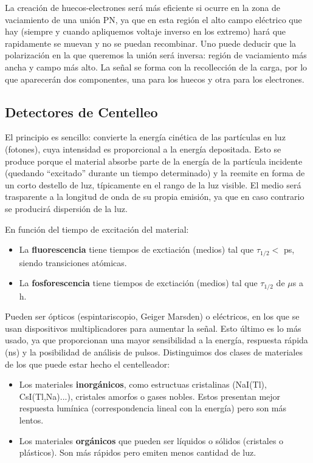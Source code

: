 La creación de huecos-electrones será más eficiente si ocurre en la zona de vaciamiento de una unión PN, ya que en esta región el alto campo eléctrico que hay (siempre y cuando apliquemos voltaje inverso en los extremo) hará que rapidamente se muevan y no se puedan recombinar. Uno puede deducir que la polarización en la que queremos la unión será inversa: región de vaciamiento más ancha y campo más alto. La señal se forma con la recollección de la carga, por lo que aparecerán dos componentes, una para los huecos y otra para los electrones. 


\subsection{Detectores de Centelleo}

El principio es sencillo: convierte la energía cinética de las partículas en luz (fotones), cuya intensidad es proporcional a la energía depositada.  Esto se produce porque el material absorbe parte de la energía de la partícula incidente (quedando ``excitado'' durante un tiempo determinado) y la reemite en forma de un corto destello de luz, típicamente en el rango de la luz visible. El medio será trasparente a la longitud de onda de su propia emisión, ya que en caso contrario se producirá dispersión de la luz. 


En función del tiempo de excitación del material:

\begin{itemize}
    \item La \textbf{fluorescencia} tiene tiempos de exctiación (medios) tal que $\tau_{1/2} <$ ps, siendo transiciones atómicas.
    \item La \textbf{fosforescencia} tiene tiempos de exctiación (medios) tal que $\tau_{1/2}$ de $\mu$s a h.
\end{itemize}
Pueden ser ópticos (espintariscopio, Geiger Marsden) o eléctricos, en los que se usan dispositivos multiplicadores para aumentar la señal. Esto último es lo más usado, ya que proporcionan una mayor sensibilidad a la energía, respuesta rápida (ns) y la posibilidad de análisis de pulsos. Distinguimos dos clases de materiales de los que puede estar hecho el centelleador:

\begin{itemize}
    \item Los materiales \textbf{inorgánicos}, como estructuas cristalinas (NaI(Tl), CsI(Tl,Na)...), cristales amorfos o gases nobles. Estos presentan mejor respuesta lumínica (correspondencia lineal con la energía) pero son más lentos.
    \item Los materiales \textbf{orgánicos} que pueden ser líquidos o sólidos (cristales o plásticos). Son más rápidos pero emiten menos cantidad de luz. 
\end{itemize}


